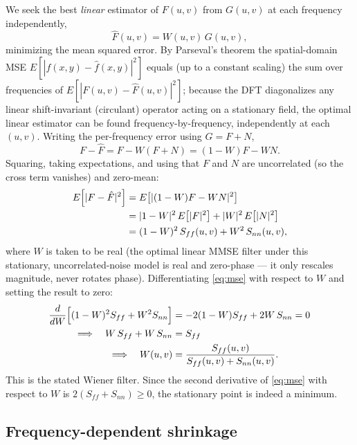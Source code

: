 \documentclass[11pt]{article}
\begin{document}
We seek the best \emph{linear} estimator of $F(u,v)$ from $G(u,v)$ at each frequency
independently,
\[
\hat F(u,v) = W(u,v)\,G(u,v),
\]
minimizing the mean squared error. By Parseval's theorem the spatial-domain MSE
$E\!\left[|f(x,y)-\hat f(x,y)|^2\right]$ equals (up to a constant scaling) the sum over
frequencies of $E\!\left[|F(u,v)-\hat F(u,v)|^2\right]$; because the DFT diagonalizes any
linear shift-invariant (circulant) operator acting on a stationary field, the optimal linear
estimator can be found frequency-by-frequency, independently at each $(u,v)$. Writing the
per-frequency error using $G=F+N$,
\[
F - \hat F = F - W(F+N) = (1-W)F - WN.
\]
Squaring, taking expectations, and using that $F$ and $N$ are uncorrelated (so the cross term
vanishes) and zero-mean:
\begin{align}
E\!\left[|F-\hat F|^2\right]
&= E\!\left[|(1-W)F - WN|^2\right] \notag\\
&= |1-W|^2\,E\!\left[|F|^2\right] + |W|^2\,E\!\left[|N|^2\right] \notag\\
&= (1-W)^2\,S_{ff}(u,v) + W^2\,S_{nn}(u,v), \label{eq:mse}
\end{align}
where $W$ is taken to be real (the optimal linear MMSE filter under this stationary,
uncorrelated-noise model is real and zero-phase — it only rescales magnitude, never rotates
phase). Differentiating \eqref{eq:mse} with respect to $W$ and setting the result to zero:
\begin{align}
\frac{d}{dW}\Big[(1-W)^2 S_{ff} + W^2 S_{nn}\Big] &= -2(1-W)S_{ff} + 2W\,S_{nn} = 0 \notag\\
\Longrightarrow\quad W\,S_{ff} + W\,S_{nn} &= S_{ff} \notag\\
\Longrightarrow\quad W(u,v) &= \frac{S_{ff}(u,v)}{S_{ff}(u,v) + S_{nn}(u,v)}. \label{eq:wiener}
\end{align}
This is the stated Wiener filter. Since the second derivative of \eqref{eq:mse} with respect
to $W$ is $2(S_{ff}+S_{nn}) \ge 0$, the stationary point is indeed a minimum.

\subsection{Frequency-dependent shrinkage}
\end{document}
